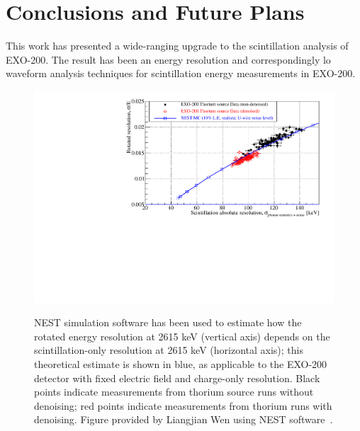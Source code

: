 \renewcommand{\thechapter}{8}
\chapter{Conclusions and Future Plans}
\label{ch:Conclusions}

This work has presented a wide-ranging upgrade to the scintillation analysis of EXO-200.  The result has been an energy resolution and correspondingly lo waveform analysis techniques for scintillation energy measurements in EXO-200.  


\begin{figure}
\begin{center}
\includegraphics[keepaspectratio=true,width=\textwidth]{resoDataMC_800eRMSInIonization_Comp.pdf}
\end{center}
\renewcommand{\baselinestretch}{1}
\small\normalsize
\begin{quote}
\caption{NEST simulation software has been used to estimate how the rotated energy resolution at 2615 keV (vertical axis) depends on the scintillation-only resolution at 2615 keV (horizontal axis); this theoretical estimate is shown in blue, as applicable to the EXO-200 detector with fixed electric field and charge-only resolution.  Black points indicate measurements from thorium source runs without denoising; red points indicate measurements from thorium runs with denoising.  Figure provided by Liangjian Wen using NEST software~\cite{NESTpaper}.}
\label{fig:ScintillationVsOverallResolution_NEST}
\end{quote}
\end{figure}
\renewcommand{\baselinestretch}{2}
\small\normalsize

